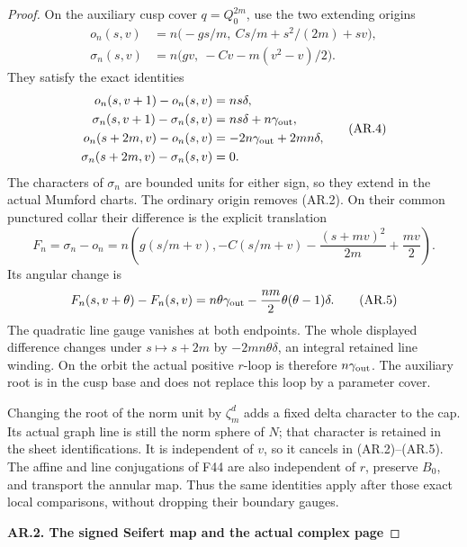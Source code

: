 \begin{proof}
On the auxiliary cusp cover \(q=Q_0^{2m}\), use the two
extending origins
\[
\begin{split}
 o_n(s,v)&=n\bigl(-gs/m,\ Cs/m+s^2/(2m)+sv\bigr),\\
 \sigma_n(s,v)&=n\bigl(gv,\ -Cv-m(v^2-v)/2\bigr).
\end{split}                                             \tag{AR.3}
\]
They satisfy the exact identities
\[
\begin{split}
 o_n(s,v+1)-o_n(s,v)&=n s\delta,\\
 \sigma_n(s,v+1)-\sigma_n(s,v)&=n s\delta+n\gamma_{\rm out},\\
 o_n(s+2m,v)-o_n(s,v)&=-2n\gamma_{\rm out}+2mn\delta,\\
 \sigma_n(s+2m,v)-\sigma_n(s,v)&=0.
\end{split}                                             \tag{AR.4}
\]
The characters of \(\sigma_n\) are bounded units for either
sign, so they extend in the actual Mumford charts. The ordinary
origin removes (AR.2). On their common punctured collar their
difference is the explicit translation
\[
 F_n=\sigma_n-o_n
 =n\left(g(s/m+v),-C(s/m+v)-\frac{(s+mv)^2}{2m}+\frac{mv}{2}\right).
\]
Its angular change is
\[
 F_n(s,v+\theta)-F_n(s,v)
   =n\theta\gamma_{\rm out}
                   -\frac{nm}{2}\theta(\theta-1)\delta.  \tag{AR.5}
\]
The quadratic line gauge vanishes at both endpoints. The whole
displayed difference changes under \(s\mapsto s+2m\) by
\(-2mn\theta\delta\), an integral retained line winding.
On the orbit the actual positive \(r\)-loop is therefore
\(n\gamma_{\rm out}\). The auxiliary root is in the cusp
base and does not replace this loop by a parameter cover.

Changing the root of the norm unit by \(\zeta_m^d\) adds a
fixed delta character to the cap. Its actual graph line is still
the norm sphere of \(N\); that character is retained in the
sheet identifications. It is independent of \(v\), so it cancels
in (AR.2)--(AR.5). The affine and line conjugations of F44 are
also independent of \(r\), preserve \(B_0\), and transport
the annular map. Thus the same identities apply after those
exact local comparisons, without dropping their boundary gauges.

\par

\medskip\noindent\textbf{AR.2. The signed Seifert map and the actual complex page}


\end{proof}
